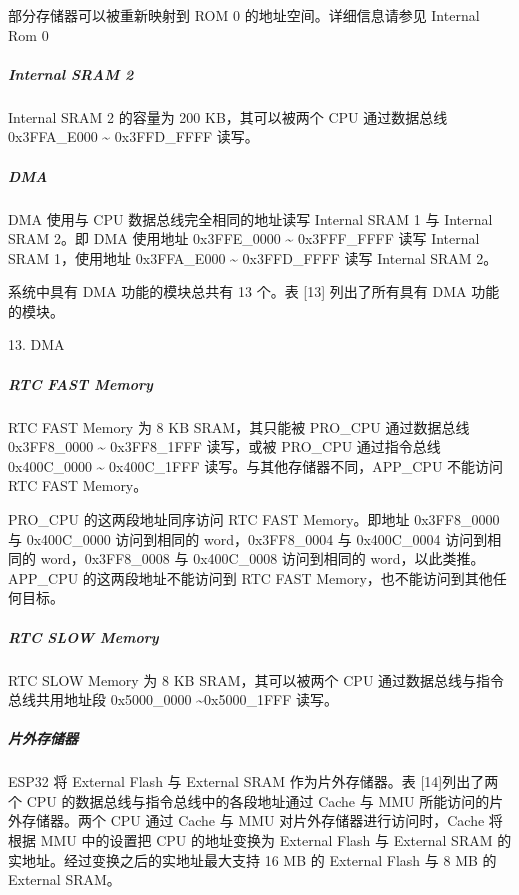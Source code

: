 \documentclass[a4paper,12pt,english]{sphinxmanual}
\begin{document}
\sphinxAtStartPar
部分存储器可以被重新映射到 ROM 0 的地址空间。详细信息请参见 Internal Rom 0


\subparagraph{Internal SRAM 2}
\label{\detokenize{dev-board/esp32:internal-sram-2}}
\sphinxAtStartPar
Internal SRAM 2 的容量为 200 KB，其可以被两个 CPU 通过数据总线 0x3FFA\_E000 \textasciitilde{} 0x3FFD\_FFFF 读写。


\subparagraph{DMA}
\label{\detokenize{dev-board/esp32:dma}}
\sphinxAtStartPar
DMA 使用与 CPU 数据总线完全相同的地址读写 Internal SRAM 1 与 Internal SRAM 2。即 DMA 使用地址 0x3FFE\_0000 \textasciitilde{} 0x3FFF\_FFFF 读写 Internal SRAM 1，使用地址 0x3FFA\_E000 \textasciitilde{} 0x3FFD\_FFFF 读写 Internal SRAM 2。

\sphinxAtStartPar
系统中具有 DMA 功能的模块总共有 13 个。表 {[}1\sphinxhyphen{}3{]} 列出了所有具有 DMA 功能的模块。

\sphinxAtStartPar
{} 1­3.  DMA 

\sphinxAtStartPar
{}


\subparagraph{RTC FAST Memory}
\label{\detokenize{dev-board/esp32:rtc-fast-memory}}
\sphinxAtStartPar
RTC FAST Memory 为 8 KB SRAM，其只能被 PRO\_CPU 通过数据总线 0x3FF8\_0000 \textasciitilde{} 0x3FF8\_1FFF 读写，或被 PRO\_CPU 通过指令总线 0x400C\_0000 \textasciitilde{} 0x400C\_1FFF 读写。与其他存储器不同，APP\_CPU 不能访问 RTC FAST Memory。

\sphinxAtStartPar
PRO\_CPU 的这两段地址同序访问 RTC FAST Memory。即地址 0x3FF8\_0000 与 0x400C\_0000 访问到相同的 word，0x3FF8\_0004 与 0x400C\_0004 访问到相同的 word，0x3FF8\_0008 与 0x400C\_0008 访问到相同的 word，以此类推。APP\_CPU 的这两段地址不能访问到 RTC FAST Memory，也不能访问到其他任何目标。


\subparagraph{RTC SLOW Memory}
\label{\detokenize{dev-board/esp32:rtc-slow-memory}}
\sphinxAtStartPar
RTC SLOW Memory 为 8 KB SRAM，其可以被两个 CPU 通过数据总线与指令总线共用地址段 0x5000\_0000 \textasciitilde{}0x5000\_1FFF 读写。


\subparagraph{片外存储器}
\label{\detokenize{dev-board/esp32:id12}}
\sphinxAtStartPar
ESP32 将 External Flash 与 External SRAM 作为片外存储器。表 {[}1\sphinxhyphen{}4{]}列出了两个 CPU 的数据总线与指令总线中的各段地址通过 Cache 与 MMU 所能访问的片外存储器。两个 CPU 通过 Cache 与 MMU 对片外存储器进行访问时，Cache 将根据 MMU 中的设置把 CPU 的地址变换为 External Flash 与 External SRAM 的实地址。经过变换之后的实地址最大支持 16 MB 的 External Flash 与 8 MB 的 External SRAM。
\end{document}
